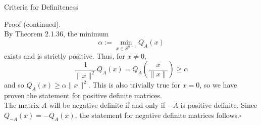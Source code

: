 \documentclass[smaller,hyperref={CJKbookmarks=true}]{beamer}
\begin{document}
\begin{frame}[t]{Criteria for Definiteness}
\begin{spacing}{1.1}
\alert{Proof (continued).}\\
By Theorem 2.1.36, the minimum
\[\alpha:=\min_{x\in S^{n-1}}Q_A(x)\]
exists and is strictly positive. Thus, for $x\neq0$,
\[\frac{1}{\|x\|^2}Q_A(x)=Q_A\left(\frac{x}{\|x\|}\right)\geq\alpha\]
and so $Q_A(x)\geq\alpha\|x\|^2$. This is also trivially true for $x=0$, so we have proven the statement for positive definite matrices.\\[6pt]
The matrix $A$ will be negative definite if and only if $-A$ is positive definite. Since $Q_{-A}(x)=-Q_A(x)$, the statement for negative definite matrices follows.\qquad\quad$\square$
\end{spacing}
\end{frame}
\end{document}

